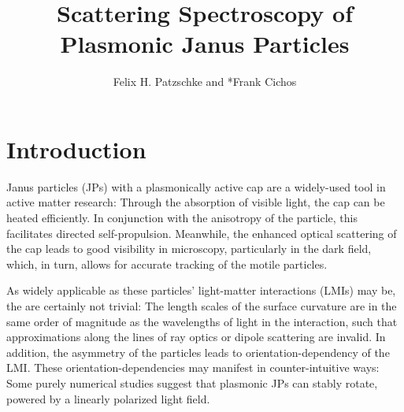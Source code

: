 \documentclass[10pt]{article}
\title{\sffamily\bfseries\color{Maroon} Scattering Spectroscopy of\\Plasmonic Janus Particles}
\author{Felix H. Patzschke and *Frank Cichos}
\date{}
\begin{document}


\twocolumn[\maketitle \begin{abstract}\sffamily \vspace{-1em}  \\ \end{abstract}]


\section*{Introduction}


Janus particles (JPs) with a plasmonically active cap are a widely-used tool in active matter research: 
Through the absorption of visible light, the cap can be heated efficiently. 
In conjunction with the anisotropy of the particle, this facilitates directed self-propulsion. 
Meanwhile, the enhanced optical scattering of the cap leads to good visibility in microscopy, particularly in the dark field, which, in turn, allows for accurate tracking of the motile particles. 


As widely applicable as these particles' light-matter interactions (LMIs) may be, the are certainly not trivial: 
The length scales of the surface curvature are in the same order of magnitude as the wavelengths of light in the interaction, such that approximations along the lines of ray optics or dipole scattering are invalid. 
In addition, the asymmetry of the particles leads to orientation-dependency of the LMI. 
These orientation-dependencies may manifest in counter-intuitive ways: 
Some purely numerical studies suggest that plasmonic JPs can stably rotate, powered by a linearly polarized light field. \cite{Ilic2017,BA}
\end{document}
